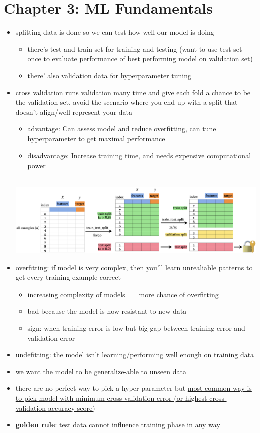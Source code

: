 \documentclass[10.5pt,a4paper, fleqn, dvipsnames]{article}
\makeatletter
\newcommand*{\sectionbookmark}[1][]{%
  \bookmark[%
    level=section,%
    dest=\@currentHref,%
    #1%
  ]%
}
\makeatother
\begin{document}
\section*{Chapter 3: ML Fundamentals}
\sectionbookmark{Chapter 3: ML Fundamentals}
\begin{itemize}
    \item splitting data is done so we can test how well our model is doing
    \begin{itemize}
        \item there's test and train set for training and testing (want to use test set once to evaluate performance of best performing model on validation set)
        \item there' also validation data for hyperparameter tuning
    \end{itemize}
    \item cross validation runs validation many time and give each fold a chance to be the validation set, avoid the scenario where you end up with a split that doesn't align/well represent your data
    \begin{itemize}
        \item advantage: Can assess model and reduce overfitting, can tune hyperparameter to get maximal performance
        \item disadvantage: Increase training time, and needs expensive computational power
    \end{itemize}\\
    \includegraphics[scale = 0.2]{train-valid-test-split.png}
    \item overfitting: if model is very complex, then you'll learn unrealiable patterns to get every training example correct 
    \begin{itemize}[leftmargin = 1.2em]
        \item increasing complexity of models $=$ more chance of overfitting
        \item bad because the model is now resistant to new data
        \item sign: when training error is low but big gap between training error and validation error
    \end{itemize}
    \item undefitting: the model isn't learning/performing well enough on training data
    \item we want the model to be generalize-able to unseen data
    \item there are no perfect way to pick a hyper-parameter but \ul{most common way is to pick model with minimum cross-validation error (or highest cross-validation accuracy score)}
    \item \textbf{golden rule}: test data cannot influence training phase in any way
\end{itemize}
\end{document}
